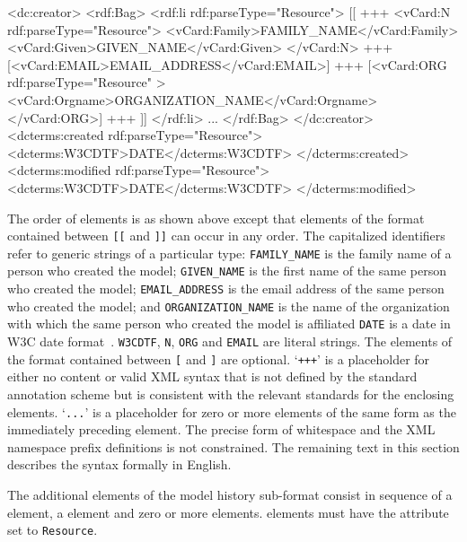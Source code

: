 \begin{blockChanged}

\begin{example}
<dc:creator>
  <rdf:Bag>
    <rdf:li rdf:parseType="Resource">
      [[
      +++
      <vCard:N rdf:parseType="Resource">
        <vCard:Family>FAMILY_NAME</vCard:Family>
        <vCard:Given>GIVEN_NAME</vCard:Given>
      </vCard:N>
      +++
      [<vCard:EMAIL>EMAIL_ADDRESS</vCard:EMAIL>]
      +++
      [<vCard:ORG rdf:parseType="Resource" >
        <vCard:Orgname>ORGANIZATION_NAME</vCard:Orgname>
      </vCard:ORG>]
      +++
      ]]
    </rdf:li>
    ...
  </rdf:Bag>
</dc:creator>
<dcterms:created rdf:parseType="Resource">
  <dcterms:W3CDTF>DATE</dcterms:W3CDTF>
</dcterms:created>
<dcterms:modified rdf:parseType="Resource">
  <dcterms:W3CDTF>DATE</dcterms:W3CDTF>
</dcterms:modified>
\end{example}

\end{blockChanged}

The order of elements is as shown above except that elements of
the format contained between \texttt{[[} and \texttt{]]} can occur
in any order.  The capitalized identifiers refer to generic
strings of a particular type: \texttt{FAMILY\_NAME} is the family
name of a person who created the model; \texttt{GIVEN\_NAME} is
the first name of the same person who created the model;
\texttt{EMAIL\_ADDRESS} is the email address of the same person
who created the model; and \texttt{ORGANIZATION\_NAME} is the name
of the organization with which the same person who created the
model is affiliated \texttt{DATE} is a date in W3C date
format~\citep{wolf:1998}. \texttt{W3CDTF}, \texttt{N},
\texttt{ORG} and \texttt{EMAIL} are literal strings. The elements
of the format contained between \texttt{[} and \texttt{]} are
optional. `\texttt{+++}' is a placeholder for either no content or
valid XML syntax that is not defined by the standard annotation
scheme but is consistent with the relevant standards for the
enclosing elements. `\texttt{...}' is a placeholder for zero or
more elements of the same form as the immediately preceding
element. The precise form of whitespace and the XML namespace
prefix definitions is not constrained.  The remaining text in this
section describes the syntax formally in English.

The additional elements of the model history sub-format consist in
sequence of a  element, a
 element and zero or more
 elements.   elements must have
the attribute  set to \texttt{Resource}.

